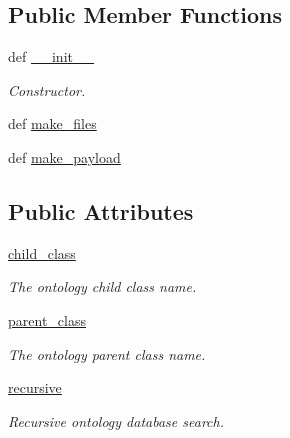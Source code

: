 \subsection*{Public Member Functions}
\begin{DoxyCompactItemize}
\item 
def \hyperlink{classRappCloud_1_1CloudMsgs_1_1OntologyIsSubsuperclass_1_1OntologyIsSubsuperclass_1_1Request_a0d815fead27ec2fe0470b1234729e219}{\-\_\-\-\_\-init\-\_\-\-\_\-}
\begin{DoxyCompactList}\small\item\em Constructor. \end{DoxyCompactList}\item 
def \hyperlink{classRappCloud_1_1CloudMsgs_1_1OntologyIsSubsuperclass_1_1OntologyIsSubsuperclass_1_1Request_a7659e992bff4e36fef6dc4d8b2e0dc85}{make\-\_\-files}
\item 
def \hyperlink{classRappCloud_1_1CloudMsgs_1_1OntologyIsSubsuperclass_1_1OntologyIsSubsuperclass_1_1Request_adc53140d2ac9cb56100e1f8cd3c77e34}{make\-\_\-payload}
\end{DoxyCompactItemize}
\subsection*{Public Attributes}
\begin{DoxyCompactItemize}
\item 
\hyperlink{classRappCloud_1_1CloudMsgs_1_1OntologyIsSubsuperclass_1_1OntologyIsSubsuperclass_1_1Request_a81e600792af94f1ce45ae755287b87f5}{child\-\_\-class}
\begin{DoxyCompactList}\small\item\em The ontology child class name. \end{DoxyCompactList}\item 
\hyperlink{classRappCloud_1_1CloudMsgs_1_1OntologyIsSubsuperclass_1_1OntologyIsSubsuperclass_1_1Request_a5a03232dfee7cbcc64f71b04dc8bc232}{parent\-\_\-class}
\begin{DoxyCompactList}\small\item\em The ontology parent class name. \end{DoxyCompactList}\item 
\hyperlink{classRappCloud_1_1CloudMsgs_1_1OntologyIsSubsuperclass_1_1OntologyIsSubsuperclass_1_1Request_a3a8614ebafb8401bc76150b64a2db4a7}{recursive}
\begin{DoxyCompactList}\small\item\em Recursive ontology database search. \end{DoxyCompactList}\end{DoxyCompactItemize}


